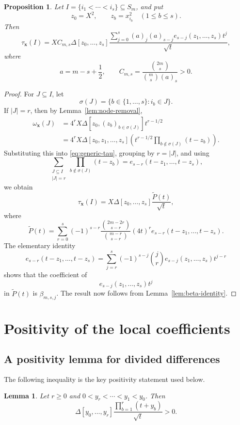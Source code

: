 \documentclass[12pt]{amsart}
\newtheorem{Lemma}[Theorem]{Lemma}
\newtheorem{Proposition}[Theorem]{Proposition}
\theoremstyle{definition}
\newcommand{\DD}{\Delta}
\begin{document}
\begin{Proposition}\label{prop:generic-local-dd}
Let $I=\{i_1<\cdots<i_s\}\subseteq S_m$,
and put
\[
z_0=X^2,
\qquad
z_b=x_{i_b}^2
\quad(1\le b\le s).
\]
Then
\begin{equation}\label{eq:generic-local-dd}
\tau_{\mathbf x}(I)
=
X C_{m,s}
\DD[z_0,\ldots,z_s]
\frac{
\displaystyle
\sum_{j=0}^s
(a)_j(a)_{s-j}
e_{s-j}(z_1,\ldots,z_s)t^j
}{\sqrt t},
\end{equation}
where
\[
a=m-s+\frac12,
\qquad
C_{m,s}
=
\frac{\binom{2m}{s}}
{\binom{m}{s}(a)_s}>0.
\]
\end{Proposition}

\begin{proof}
For $J\subseteq I$, let
\[
\sigma(J)
=
\{b\in\{1,\ldots,s\}:i_b\in J\}.
\]
If $|J|=r$, then by Lemma~\ref{lem:node-removal},
\[
\begin{aligned}
\omega_{\mathbf x}(J)
&=
4^rX
\DD[z_0,(z_b)_{b\in\sigma(J)}]t^{r-1/2}\\
&=
4^rX
\DD[z_0,z_1,\ldots,z_s]
\left(
t^{r-1/2}
\prod_{b\notin\sigma(J)}(t-z_b)
\right).
\end{aligned}
\]
Substituting this into \eqref{eq:generic-tau}, grouping by $r=|J|$, and
using
\[
\sum_{\substack{J\subseteq I\\|J|=r}}
\prod_{b\notin\sigma(J)}(t-z_b)
=
e_{s-r}(t-z_1,\ldots,t-z_s),
\]
we obtain
\[
\tau_{\mathbf x}(I)
=
X\DD[z_0,\ldots,z_s]
\frac{\widetilde P(t)}{\sqrt t},
\]
where
\[
\widetilde P(t)
=
\sum_{r=0}^s
(-1)^{s-r}
\frac{\binom{2m-2r}{s-r}}
{\binom{m-r}{s-r}}
(4t)^r
e_{s-r}(t-z_1,\ldots,t-z_s).
\]
The elementary identity
\[
e_{s-r}(t-z_1,\ldots,t-z_s)
=
\sum_{j=r}^s
(-1)^{s-j}\binom{j}{r}
e_{s-j}(z_1,\ldots,z_s)t^{j-r}
\]
shows that the coefficient of
\[
e_{s-j}(z_1,\ldots,z_s)t^j
\]
in $\widetilde P(t)$ is $\beta_{m,s,j}$.  The result now follows from
Lemma~\ref{lem:beta-identity}.
\end{proof}

\section{Positivity of the local coefficients}\label{sec:plus}
\subsection{A positivity lemma for divided differences}

The following inequality is the key positivity statement used below.

\begin{Lemma}\label{lem:dd-positive}
Let $r\ge0$ and $0<y_r<\cdots<y_1<y_0$.
Then
\[
\DD[y_0,\ldots,y_r]
\frac{\prod_{b=1}^r(t+y_b)}{\sqrt t}
>0.
\]
\end{Lemma}
\end{document}
